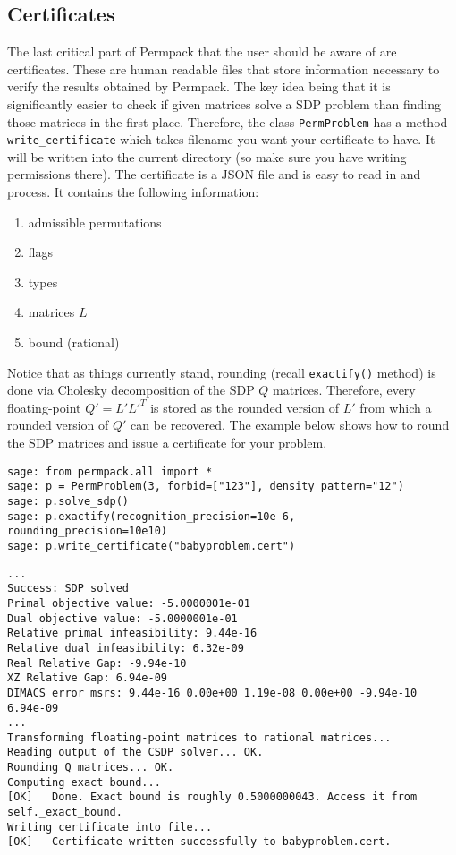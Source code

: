 \subsection{Certificates}
\label{subsec:certificates}
The last critical part of Permpack that the user should be aware of are certificates. These are human readable files that store information necessary to verify the results obtained by Permpack. The key idea being that it is significantly easier to check if given matrices solve a SDP problem than finding those matrices in the first place. Therefore, the class \texttt{PermProblem} has a method \texttt{write\_certificate} which takes filename you want your certificate to have. It will be written into the current directory (so make sure you have writing permissions there). The certificate is a JSON file and is easy to read in and process. It contains the following information:
\begin{enumerate}
\item admissible permutations
\item flags
\item types
\item matrices $L$
\item bound (rational)
\end{enumerate}
Notice that as things currently stand, rounding (recall \texttt{exactify()} method) is done via Cholesky decomposition of the SDP $Q$ matrices. Therefore, every floating-point $Q' = L'L'^T$ is stored as the rounded version of $L'$ from which a rounded version of $Q'$ can be recovered. The example below shows how to round the SDP matrices and issue a certificate for your problem.

 {}
\begin{lstlisting}
sage: from permpack.all import *
sage: p = PermProblem(3, forbid=["123"], density_pattern="12")
sage: p.solve_sdp()
sage: p.exactify(recognition_precision=10e-6, rounding_precision=10e10)
sage: p.write_certificate("babyproblem.cert")
\end{lstlisting}

\begin{lstlisting}
...
Success: SDP solved
Primal objective value: -5.0000001e-01 
Dual objective value: -5.0000001e-01 
Relative primal infeasibility: 9.44e-16 
Relative dual infeasibility: 6.32e-09 
Real Relative Gap: -9.94e-10 
XZ Relative Gap: 6.94e-09 
DIMACS error msrs: 9.44e-16 0.00e+00 1.19e-08 0.00e+00 -9.94e-10 6.94e-09
...
Transforming floating-point matrices to rational matrices...
Reading output of the CSDP solver... OK.
Rounding Q matrices... OK.
Computing exact bound...
[OK]   Done. Exact bound is roughly 0.5000000043. Access it from
self._exact_bound.
Writing certificate into file... 
[OK]   Certificate written successfully to babyproblem.cert.
\end{lstlisting}


